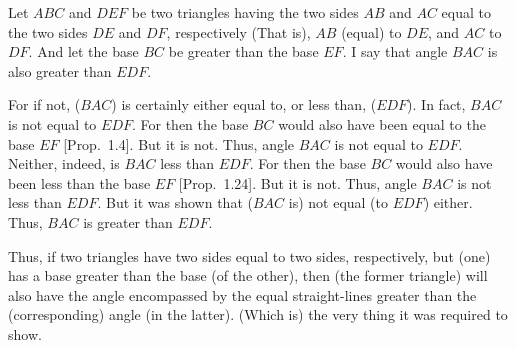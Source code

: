 \begin{Parallel}{}{}
{Let $ABC$ and $DEF$ be  two triangles having the two sides $AB$ and $AC$
equal to the two sides $DE$ and $DF$, respectively (That is), $AB$ (equal) to $DE$, and $AC$ to $DF$. And let the base $BC$ be greater than the base $EF$. I say that angle
$BAC$ is also greater than $EDF$.

For if not, ($BAC$) is certainly either equal to, or less than, ($EDF$). In fact, $BAC$ is not equal to
$EDF$. For then the base $BC$ would also have been equal to the base $EF$ [Prop.~1.4]. But it is not.
Thus, angle $BAC$ is not equal to $EDF$. Neither, indeed, is $BAC$ less
than $EDF$. For then the base $BC$ would also have been less than the base $EF$ [Prop.~1.24].
But it is not. Thus, angle $BAC$ is not less than $EDF$. But it was  shown
that ($BAC$ is) not equal (to $EDF$) either. Thus, $BAC$ is greater than $EDF$.

Thus, if two triangles have two sides equal to two sides, respectively,
but (one) has a base greater than the base (of the other), then (the former triangle) will also have the angle encompassed by the equal straight-lines greater than the (corresponding) angle (in the latter). (Which is) the
very thing it was required to show.}
\end{Parallel}

